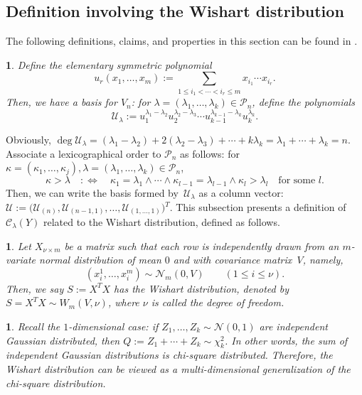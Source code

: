 \documentclass[smallextended]{svjour3}
\newtheorem{defn}[thm]{\protect\definitionname}
\newtheorem{rem}[thm]{\protect\remarkname}
\providecommand{\definitionname}{Definition}
\providecommand{\remarkname}{Remark}
\begin{document}
\subsection{Definition involving the Wishart distribution}\label{sec:Wishart}
The following definitions, claims, and properties in this section
can be found in \cite[pp.~9--22]{Takemura}.
\begin{defn}
Define the elementary symmetric polynomial
\[
  u_{r}(x_{1},\ldots,x_{m}):=\underset{1\leq i_{1}<\cdots<i_{r}\leq m}{\sum}x_{i_{1}}\cdots x_{i_{r}}.
\]
Then, we have a basis for $V_n$: for $\lambda=(\lambda_{1},\ldots,\lambda_{k})\in\mathcal{P}_{n}$, define the polynomials
\[
  \mathcal{U}_{\lambda} :=
  u_{1}^{\lambda_{1}-\lambda_{2}}u_{2}^{\lambda_{2}-\lambda_{3}}\cdots u_{k-1}^{\lambda_{k-1}-\lambda_{k}}u_{k}^{\lambda_{k}}.
\]
\end{defn}
\noindent
Obviously,
$\deg\mathcal{U}_{\lambda} =
  \left(\lambda_{1}-\lambda_{2}\right)+2\left(\lambda_{2}-\lambda_{3}\right)+\cdots+k\lambda_{k} =
  \lambda_{1}+\cdots+\lambda_{k}=n$.
Associate a lexicographical order to $\mathcal{P}_{n}$ as follows:
for $\kappa=\left(\kappa_1,\ldots,\kappa_j\right),\lambda=\left(\lambda_1,\ldots,\lambda_k\right)\in\mathcal{P}_{n}$,
\[
  \kappa>\lambda \quad:\Leftrightarrow\quad
  \kappa_1=\lambda_1\land\cdots\land\kappa_{l-1}=\lambda_{l-1}\land\kappa_{l}>\lambda_{l}
  \quad\text{for some }l.
\]
Then, we can write the basis formed by~$\mathcal{U}_{\lambda}$
as a column vector:
$
\mathcal{U}:=\bigl(\mathcal{U}_{(n)},\allowbreak \mathcal{U}_{(n-1,1)},\ldots,\mathcal{U}_{(1,\ldots,1)}\bigr){}^{T}.
$
This subsection presents a definition of $\mathcal{C}_{\lambda}(Y)$
related to the Wishart distribution, defined as follows.
\begin{defn}
Let $X_{\nu\times m}$ be a matrix such that each row is independently drawn
from an $m$-variate normal distribution of mean $0$ and with covariance
matrix~$V$, namely, 
\[
  (x_{i}^{1},\ldots,x_{i}^{m})\sim\mathcal{N}_{m}(0,V)
  \qquad (1\leq i\leq\nu).
\]
Then, we say $S:=X^{T}X$ has the Wishart distribution, denoted by $S=X^{T}X\sim W_{m}(V,\nu)$, where $\nu$ is called the degree of freedom.
\end{defn}
\begin{rem}
Recall the $1$-dimensional case: if $Z_{1},\ldots,Z_{k}\sim\mathcal{N}(0,1)$
are independent Gaussian distributed, then $Q:=Z_{1}+\cdots+Z_{k}\sim\chi_{k}^{2}$.
In other words, the sum of independent Gaussian distributions is chi-square
distributed. Therefore, the Wishart distribution can be viewed as a multi-dimensional
generalization of the chi-square distribution.
\end{rem}
\end{document}
